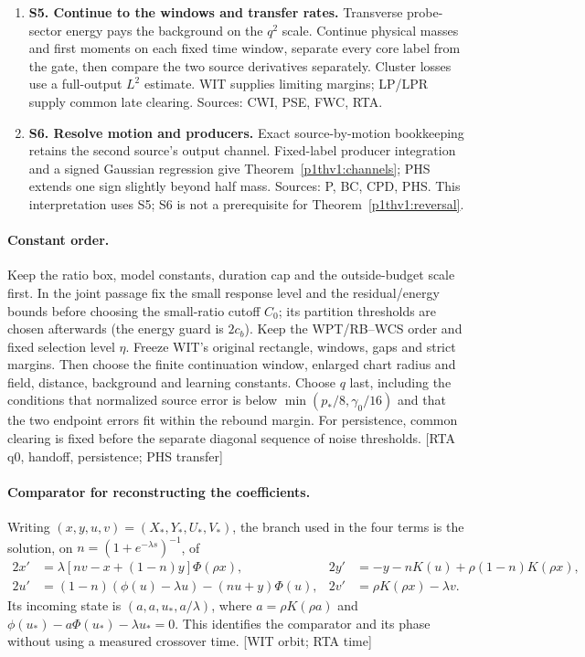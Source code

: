 \documentclass[10pt,twocolumn]{article}
\newcommand{\src}[1]{\textnormal{\small [#1]}}
\begin{document}
\begin{enumerate}
weak mass with \(O_\eta(q^{1/20})\) error. Sources: WEAK, TAILREP,
SI (interface), WBR, MP, SRR, WCS.
\item \textbf{S5. Continue to the windows and transfer rates.}
Transverse probe-sector energy pays the background on the \(q^2\)
scale. Continue physical masses and first moments on each fixed time
window, separate every core label from the gate, then compare the two
source derivatives separately. Cluster losses use a full-output
\(L^2\) estimate. WIT supplies limiting margins; LP/LPR supply
common late clearing. Sources: CWI, PSE, FWC, RTA.
\item \textbf{S6. Resolve motion and producers.} Exact source-by-motion
bookkeeping retains the second source's output channel. Fixed-label
producer integration and a signed Gaussian regression give
Theorem~\ref{p1thv1:channels}; PHS extends one sign slightly beyond
half mass. Sources: P, BC, CPD, PHS. This interpretation uses S5;
S6 is not a prerequisite for Theorem~\ref{p1thv1:reversal}.
\end{enumerate}
\paragraph{Constant order.} Keep the ratio box, model constants,
duration cap and the outside-budget scale first. In the joint passage
fix the small response level and the residual/energy bounds before
choosing the small-ratio cutoff \(C_0\); its partition thresholds
are chosen afterwards (the energy guard is \(2c_b\)). Keep the
WPT/RB--WCS order and fixed selection level \(\eta\). Freeze WIT's
original rectangle, windows, gaps and strict margins. Then choose the
finite continuation window, enlarged chart radius and field, distance,
background and learning constants. Choose \(q\) last, including the
conditions that normalized source error is below
\(\min(p_*/8,\gamma_0/16)\) and that the two endpoint errors fit
within the rebound margin. For persistence, common clearing is fixed
before the separate diagonal sequence of noise thresholds.
\src{RTA q0, handoff, persistence; PHS transfer}

\paragraph{Comparator for reconstructing the coefficients.}
Writing \((x,y,u,v)=(X_*,Y_*,U_*,V_*)\), the branch used in the four
terms is the solution, on \(n=(1+e^{-\lambda s})^{-1}\), of
\[
\begin{aligned}
 2x'&=\lambda[nv-x+(1-n)y]\Phi(\rho x),&
 2y'&=-y-nK(u)+\rho(1-n)K(\rho x),\\
 2u'&=(1-n)(\phi(u)-\lambda u)-(nu+y)\Phi(u),&
 2v'&=\rho K(\rho x)-\lambda v .
\end{aligned}
\]
Its incoming state is \((a,a,u_*,a/\lambda)\), where
\(a=\rho K(\rho a)\) and \(\phi(u_*)-a\Phi(u_*)-\lambda u_*=0\).
This identifies the comparator and its phase without using a measured
crossover time. \src{WIT orbit; RTA time}
\end{document}
